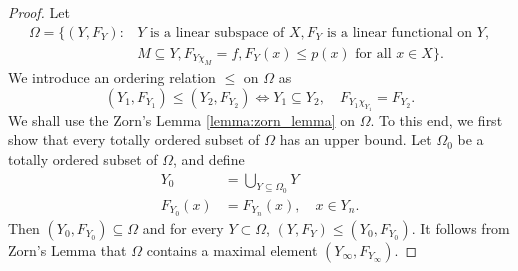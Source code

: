 \begin{proof}
Let 
\begin{equation*}
    \begin{aligned}
        \Omega = \{ (Y, F_Y): 
        &Y \text{ is a linear subspace of } X, 
        F_Y \text{ is a linear functional on } Y, \\
        &M \subseteq Y, 
        F_{Y \chi_M} = f, 
        F_Y(x) \le p(x) \text{ for all } x \in X \}.
    \end{aligned}
\end{equation*}
We introduce an ordering relation $\le$ on $\Omega$ as 
\begin{equation*}
    (Y_1, F_{Y_1}) \le (Y_2, F_{Y_2}) \iff 
    Y_1 \subseteq Y_2, \quad F_{Y_1 \chi_{Y_1}} = F_{Y_2}. 
\end{equation*}
We shall use the Zorn's Lemma \ref{lemma:zorn_lemma} on $\Omega$. 
To this end, we first show that every totally ordered subset of $\Omega$ 
has an upper bound. 
Let $\Omega_0$ be a totally ordered subset of $\Omega$, and define 
\begin{equation*}
    \begin{aligned}
        Y_0 &= \bigcup_{Y \subseteq \Omega_0} Y \\
        F_{Y_0}(x) &= F_{Y_n}(x), \quad x \in Y_n. 
    \end{aligned}
\end{equation*}
Then $(Y_0, F_{Y_0}) \subseteq \Omega$ and for every $Y \subset 
\Omega$, $(Y, F_Y) \le (Y_0, F_{Y_0})$. 
It follows from Zorn's Lemma that $\Omega$ contains a maximal element 
$(Y_\infty, F_{Y_\infty})$. 


\end{proof}
